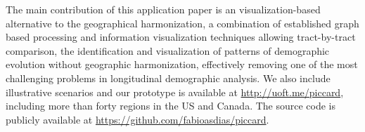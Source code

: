 The main contribution of this application paper is an visualization-based
alternative to the geographical harmonization, a combination of established
graph based processing and information visualization techniques allowing
tract-by-tract comparison, the identification and visualization of patterns of
demographic evolution without geographic harmonization, effectively removing one
of the most challenging problems in longitudinal demographic analysis. We also
include illustrative scenarios and our prototype is available at
\url{http://uoft.me/piccard}, including more than forty regions in the US and
Canada. The source code is publicly available at
\url{https://github.com/fabioasdias/piccard}.

